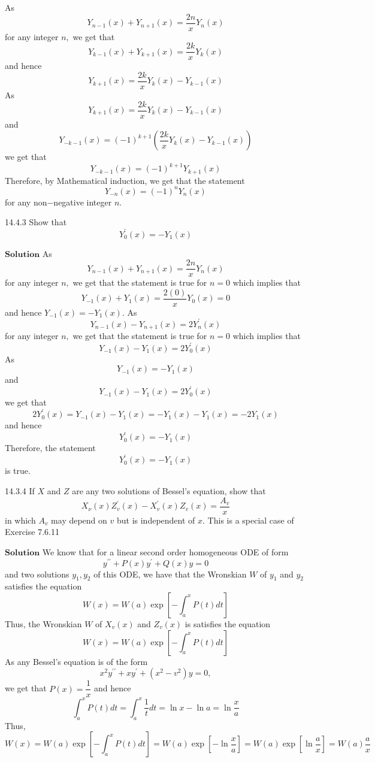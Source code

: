 \documentclass{article}
\begin{document}
\begin{flushleft}
As 
$$Y_{n-1}(x)+Y_{n+1}(x)=\frac{2 n}{x} Y_{n}(x)$$
for any integer $n,$ we get that 
$$Y_{k-1}(x)+Y_{k+1}(x)=\frac{2 k}{x} Y_{k}(x)$$
and hence 
$$Y_{k+1}(x)=\frac{2 k}{x} Y_{k}(x)-Y_{k-1}(x)$$
As 
$$Y_{k+1}(x)=\frac{2 k}{x} Y_{k}(x)-Y_{k-1}(x)$$
and 
$$Y_{-k-1}(x)=(-1)^{k+1}\left(\frac{2 k}{x} Y_{k}(x)-Y_{k-1}(x)\right)$$ 
we get that
$$Y_{-k-1}(x)=(-1)^{k+1} Y_{k+1}(x)$$
Therefore, by Mathematical induction, we get that the statement 
$$Y_{-n}(x)=(-1)^{n} Y_{n}(x)$$ 
for any non$-$negative integer $n$.



\newpage


\begin{mybox}{14.4.3}
Show that
$$
Y_{0}^{\prime}(x)=-Y_{1}(x)
$$
\end{mybox}
$\boxed{\textbf{Solution}}$ As 
$$Y_{n-1}(x)+Y_{n+1}(x)=\frac{2 n}{x} Y_{n}(x)$$ 
for any integer $n,$ we get that the statement is true for $n=0$ which implies that 
$$Y_{-1}(x)+Y_{1}(x)=\frac{2(0)}{x} Y_{0}(x)=0$$ and hence $Y_{-1}(x)=-Y_{1}(x)$. As 
$$Y_{n-1}(x)-Y_{n+1}(x)=2 Y_{n}^{\prime}(x)$$ 
for any integer $n,$ we get that the statement is true for $n=0$ which implies that 
$$Y_{-1}(x)-Y_{1}(x)=2 Y_{0}^{\prime}(x)$$
As 
$$Y_{-1}(x)=-Y_{1}(x)$$ 
and 
$$Y_{-1}(x)-Y_{1}(x)=2 Y_{0}^{\prime}(x)$$ 
we get that
$$2 Y_{0}^{\prime}(x)=Y_{-1}(x)-Y_{1}(x)=-Y_{1}(x)-Y_{1}(x)=-2 Y_{1}(x)$$ 
and hence 
$$Y_{0}^{\prime}(x)=-Y_{1}(x)$$
Therefore, the statement 
$$Y_{0}^{\prime}(x)=-Y_{1}(x)$$ 
is true.




\newpage




\begin{mybox}{14.3.4}
If $X$ and $Z$ are any two solutions of Bessel's equation, show that
$$
X_{\nu}(x) Z_{v}^{\prime}(x)-X_{v}^{\prime}(x) Z_{v}(x)=\frac{A_{v}}{x}
$$
in which $A_{v}$ may depend on $v$ but is independent of $x$. This is a special case of Exercise 7.6.11
\end{mybox}
$\boxed{\textbf{Solution}}$ We know that for a linear second order homogeneous ODE of form 
$$y^{\prime \prime}+P(x) y^{\prime}+Q(x) y=0$$
and two solutions $y_{1}, y_{2}$ of this ODE, we have that the Wronskian $W$ of $y_{1}$ and $y_{2}$ satisfies the equation 
$$W(x)=W(a) \exp \left[-\int_{a}^{x} P(t) d t\right]$$
Thus, the Wronskian $W$ of $X_{v}(x)$ and $Z_{v}(x)$ is satisfies the equation 
$$W(x)=W(a) \exp \left[-\int_{a}^{x} P(t) d t\right]$$
As any Bessel's equation is of the form 
$$x^{2} y^{\prime \prime}+x y^{\prime}+\left(x^{2}-v^{2}\right) y=0,$$ 
we get that $P(x)=\dfrac{1}{x}$ and hence 
$$\int_{a}^{x} P(t) d t=\int_{a}^{x} \frac{1}{t} d t=\ln x-\ln a=\ln \frac{x}{a}$$
Thus, 
$$W(x)=W(a) \exp \left[-\int_{a}^{x} P(t) d t\right]=W(a) \exp \left[-\ln \frac{x}{a}\right]=W(a) \exp \left[\ln \frac{a}{x}\right]=W(a) \frac{a}{x}$$


\end{flushleft}
\end{document}
